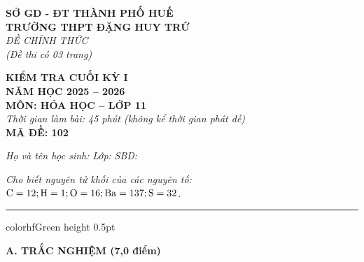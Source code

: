 \documentclass[11pt,a4paper]{article}
\begin{document}
\begin{minipage}[t]{0.48\textwidth}
\textbf{SỞ GD - ĐT THÀNH PHỐ HUẾ}\\
\textbf{TRƯỜNG THPT ĐẶNG HUY TRỨ}\\
\textit{ĐỀ CHÍNH THỨC}\\
\textit{(Đề thi có 03 trang)}
\end{minipage}
\hfill
\begin{minipage}[t]{0.48\textwidth}
\raggedleft
\textbf{\color{hfRed}KIỂM TRA CUỐI KỲ I}\\
\textbf{NĂM HỌC 2025 -- 2026}\\
\textbf{MÔN: HÓA HỌC -- LỚP 11}\\
\textit{Thời gian làm bài: 45 phút (không kể thời gian phát đề)}\\
\textbf{MÃ ĐỀ: 102}
\end{minipage}

\vspace{4pt}
\noindent
\textit{Họ và tên học sinh:} \dotfill \textit{Lớp:} \dotfill \textit{SBD:} \dotfill

\vspace{3pt}
\noindent
\textit{\footnotesize Cho biết nguyên tử khối của các nguyên tố: $\ce{C} = 12; \ce{H} = 1; \ce{O} = 16; \ce{Ba} = 137; \ce{S} = 32$.}

\vspace{3pt}
\hrule color{hfGreen} height 0.5pt

\vspace{6pt}
{\large\bfseries\color{mainGreen} A. TRẮC NGHIỆM (7,0 điểm)}
\end{document}

